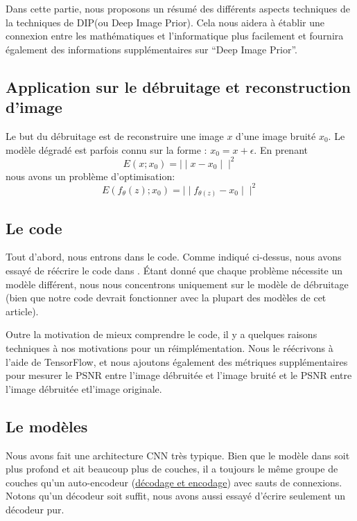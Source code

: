 \documentclass[
  11pt,
  dvipsnames]{article}
\begin{document}
Dans cette partie, nous proposons un résumé des différents aspects techniques de la techniques de DIP(ou Deep Image Prior).
Cela nous aidera à établir une connexion entre les mathématiques et l'informatique plus facilement
et fournira également des informations supplémentaires sur ``Deep Image Prior''.

\hypertarget{application-sur-le-duxe9bruitage-et-reconstruction-dimage}{%
\subsection{Application sur le débruitage et reconstruction d'image}\label{application-sur-le-duxe9bruitage-et-reconstruction-dimage}}

Le but du débruitage est de reconstruire une image \(x\) d'une image bruité \(x_0\). Le modèle dégradé est parfois connu sur la forme : \(x_0 = x + \epsilon\). En prenant \[ E(x;x_{0})= \mid\mid x - x_{0} \mid\mid^2 \] nous avons un problème d'optimisation: \[ E(f_{\theta}(z);x_{0})= \mid\mid f_{\theta(z)} - x_{0} \mid\mid^2 \]

\hypertarget{le-code}{%
\subsection{Le code}\label{le-code}}

Tout d'abord, nous entrons dans le code. Comme indiqué ci-dessus, nous avons essayé de réécrire le code dans \autocite{1711.10925}.
Étant donné que chaque problème nécessite un modèle différent, nous nous concentrons uniquement sur le modèle de débruitage
(bien que notre code devrait fonctionner avec la plupart des modèles de cet article).

Outre la motivation de mieux comprendre le code, il y a
quelques raisons techniques à nos motivations pour un réimplémentation.
Nous le réécrivons à l'aide de TensorFlow, et nous ajoutons également
des métriques supplémentaires pour mesurer le PSNR entre l'image
débruitée et l'image bruité et le PSNR entre l'image débruitée etl'image originale.

\hypertarget{le-moduxe8les}{%
\subsection{Le modèles}\label{le-moduxe8les}}

Nous avons fait une architecture CNN très typique. Bien que le modèle dans \autocite{1711.10925}
soit plus profond et ait beaucoup plus de couches, il a toujours le même groupe de couches
qu'un auto-encodeur (\protect\hyperlink{duxe9codage-et-encodage}{décodage et encodage}) avec sauts de connexions. Notons qu'un décodeur soit suffit,
nous avons aussi essayé d'écrire seulement un décodeur pur.
\end{document}
